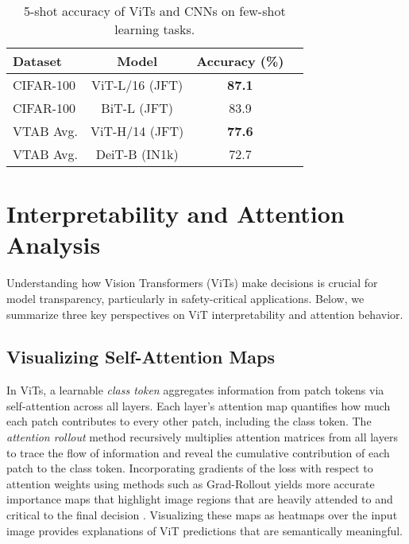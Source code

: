 \documentclass[conference]{IEEEtran}
\begin{document}
\begin{table}[ht]
    \centering
    \caption{5-shot accuracy of ViTs and CNNs on few-shot learning tasks.}
    \begin{tabular}{lccc}
        \hline
        \textbf{Dataset} & \textbf{Model} & \textbf{Accuracy (\%)} \\ \hline
        CIFAR-100        & ViT-L/16 (JFT) & \textbf{87.1}          \\
        CIFAR-100        & BiT-L (JFT)    & 83.9                   \\
        VTAB Avg.        & ViT-H/14 (JFT) & \textbf{77.6}          \\
        VTAB Avg.        & DeiT-B (IN1k)  & 72.7                   \\ \hline
    \end{tabular}
\end{table}



\section{Interpretability and Attention Analysis}

Understanding how Vision Transformers (ViTs) make decisions is crucial for model transparency, particularly in safety-critical applications. Below, we summarize three key perspectives on ViT interpretability and attention behavior.

\subsection{Visualizing Self-Attention Maps}

In ViTs, a learnable \emph{class token} aggregates information from patch tokens via self-attention across all layers. Each layer's attention map quantifies how much each patch contributes to every other patch, including the class token. The \emph{attention rollout} method recursively multiplies attention matrices from all layers to trace the flow of information and reveal the cumulative contribution of each patch to the class token. Incorporating gradients of the loss with respect to attention weights using methods such as Grad-Rollout yields more accurate importance maps that highlight image regions that are heavily attended to and critical to the final decision \cite{zhang2021attention}. Visualizing these maps as heatmaps over the input image provides explanations of ViT predictions that are semantically meaningful.
\end{document}
